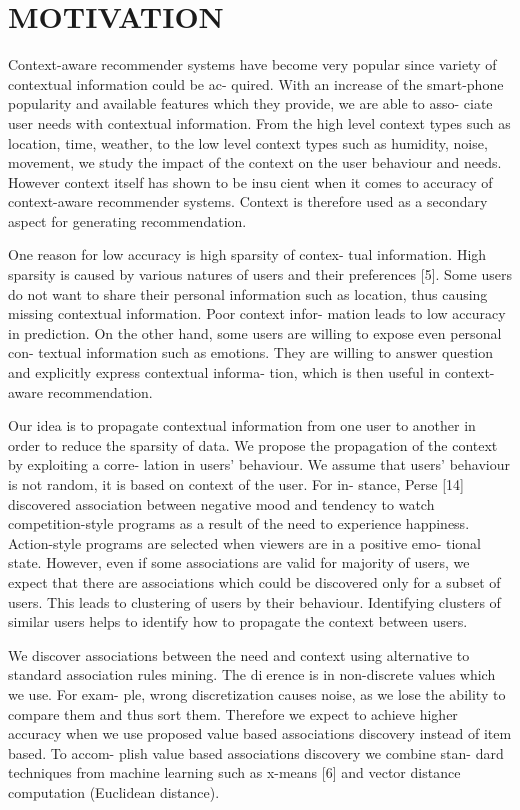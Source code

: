 \documentclass{acm_proc_article-sp} %
\begin{document}
\section{MOTIVATION}
Context-aware recommender systems have become very
popular since variety of contextual information could be ac-
quired. With an increase of the smart-phone popularity and
available features which they provide, we are able to asso-
ciate user needs with contextual information. From the high
level context types such as location, time, weather, to the
low level context types such as humidity, noise, movement,
we study the impact of the context on the user behaviour and
needs. However context itself has shown to be insucient
when it comes to accuracy of context-aware recommender
systems. Context is therefore used as a secondary aspect for
generating recommendation.

One reason for low accuracy is high sparsity of contex-
tual information. High sparsity is caused by various natures
of users and their preferences [5]. Some users do not want
to share their personal information such as location, thus
causing missing contextual information. Poor context infor-
mation leads to low accuracy in prediction. On the other
hand, some users are willing to expose even personal con-
textual information such as emotions. They are willing to
answer question and explicitly express contextual informa-
tion, which is then useful in context-aware recommendation.

Our idea is to propagate contextual information from one
user to another in order to reduce the sparsity of data. We
propose the propagation of the context by exploiting a corre-
lation in users' behaviour. We assume that users' behaviour
is not random, it is based on context of the user. For in-
stance, Perse [14] discovered association between negative
mood and tendency to watch competition-style programs as
a result of the need to experience happiness. Action-style
programs are selected when viewers are in a positive emo-
tional state. However, even if some associations are valid
for majority of users, we expect that there are associations
which could be discovered only for a subset of users. This
leads to clustering of users by their behaviour. Identifying
clusters of similar users helps to identify how to propagate
the context between users.

We discover associations between the need and context
using alternative to standard association rules mining. The
dierence is in non-discrete values which we use. For exam-
ple, wrong discretization causes noise, as we lose the ability
to compare them and thus sort them. Therefore we expect to
achieve higher accuracy when we use proposed value based
associations discovery instead of item based. To accom-
plish value based associations discovery we combine stan-
dard techniques from machine learning such as x-means [6]
and vector distance computation (Euclidean distance).
\end{document}

